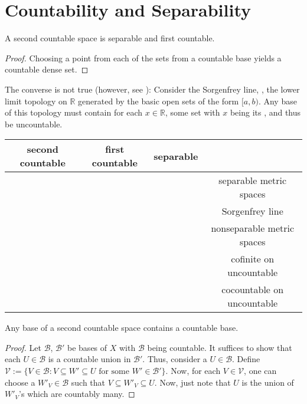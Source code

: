 	



\section{Countability and Separability}

	\begin{lem}
		A second countable space is separable and first countable.
	\end{lem}
	
	\begin{proof}
		Choosing a point from each of the sets from a countable base yields a countable dense set.
	\end{proof}
	
	\begin{rmk}
		The converse is not true (however, see ): Consider the Sorgenfrey line, \ie, the lower limit topology on $\mathbb R$ generated by the basic open sets of the form $[a, b)$. Any base of this topology must contain for each $x\in\mathbb R$, some set with $x$ being its \lub, and thus be uncountable.
	\end{rmk}
	
	\begin{center}
		\begin{tabular}{c|c|c|c}
			second countable & first countable & separable & \\
			\hline
			\mycheck & & & separable metric spaces\\
			\mycross & \mycheck & \mycheck & Sorgenfrey line\\
			\mycross & \mycheck & \mycross & nonseparable metric spaces\footnotemark\\
			& \mycross & \mycheck & cofinite on uncountable\\
			& \mycross & \mycross & cocountable on uncountable
		\end{tabular}
	\end{center}
	

	\begin{prp}
		Any base of a second countable space contains a countable base.
	\end{prp}
	
	\begin{proof}
		Let $\mathscr B$, $\mathscr B'$ be bases of $X$ with $\mathscr B$ being countable. It suffices
		to show that each $U\in\mathscr B$ is a countable union in $\mathscr B'$. Thus, consider a $U\in\mathscr B$.
		Define $\mathscr V:= \{V\in\mathscr B : V\subseteq W'\subseteq U \text{ for some } W'\in\mathscr B'\}$. Now, for each $V\in\mathscr V$, one can choose
		a $W'_V\in\mathscr B$ such that $V\subseteq W'_V\subseteq U$. Now, just note that $U$ is the union of $W'_V$'s which are countably many.
	\end{proof}
	
